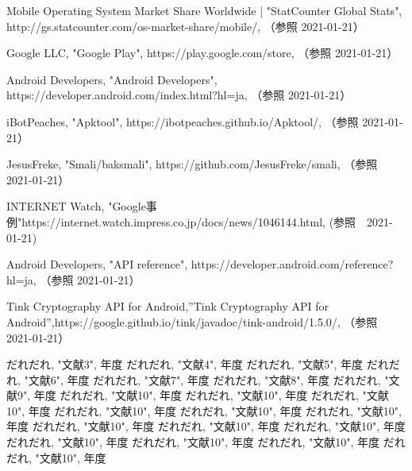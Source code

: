 \newpage
\begin{thebibliography}{99}

Mobile Operating System Market Share Worldwide |  "StatCounter Global Stats",
http://gs.statcounter.com/os-market-share/mobile/, （参照 2021-01-21）

Google LLC, "Google Play", https://play.google.com/store, （参照 2021-01-21）

Android Developers, "Android Developers", https://developer.android.com/index.html?hl=ja, （参照 2021-01-21）

iBotPeaches, "Apktool", https://ibotpeaches.github.io/Apktool/, （参照 2021-01-21）

JesusFreke, "Smali/baksmali", https://github.com/JesusFreke/smali, （参照 2021-01-21）


INTERNET Watch, "Google事例"https://internet.watch.impress.co.jp/docs/news/1046144.html, (参照　2021-01-21)

Android Developers, "API reference", https://developer.android.com/reference?hl=ja, （参照 2021-01-21）

Tink Cryptography API for Android,''Tink Cryptography API for Android'',https://google.github.io/tink/javadoc/tink-android/1.5.0/, （参照 2021-01-21）



だれだれ, "文献3", 年度
だれだれ, "文献4", 年度
だれだれ, "文献5", 年度
だれだれ, "文献6", 年度
だれだれ, "文献7", 年度
だれだれ, "文献8", 年度
だれだれ, "文献9", 年度
だれだれ, "文献10", 年度
だれだれ, "文献10", 年度
だれだれ, "文献10", 年度
だれだれ, "文献10", 年度
だれだれ, "文献10", 年度
だれだれ, "文献10", 年度
だれだれ, "文献10", 年度
だれだれ, "文献10", 年度
だれだれ, "文献10", 年度
だれだれ, "文献10", 年度
だれだれ, "文献10", 年度
だれだれ, "文献10", 年度
だれだれ, "文献10", 年度

\end{thebibliography}